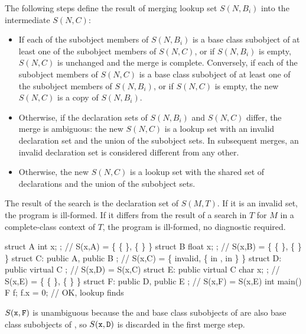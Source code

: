 \pnum
The following steps define the result of merging lookup set $S(N,B_i)$
into the intermediate $S(N,C)$:

\begin{itemize}
\item If each of the subobject members of $S(N,B_i)$ is a base class
subobject of at least one of the subobject members of $S(N,C)$, or if
$S(N,B_i)$ is empty, $S(N,C)$ is unchanged and the merge is complete.
Conversely, if each of the subobject members of $S(N,C)$ is a base class
subobject of at least one of the subobject members of $S(N,B_i)$, or if
$S(N,C)$ is empty, the new $S(N,C)$ is a copy of $S(N,B_i)$.

\item Otherwise, if the declaration sets of $S(N,B_i)$ and $S(N,C)$
differ, the merge is ambiguous: the new $S(N,C)$ is a lookup set with an
invalid declaration set and the union of the subobject sets. In
subsequent merges, an invalid declaration set is considered different
from any other.

\item Otherwise, the new $S(N,C)$ is a lookup set with the shared set of
declarations and the union of the subobject sets.
\end{itemize}

\pnum
The result of the search is the declaration set of $S(M,T)$.
If it is an invalid set, the program is ill-formed.
If it differs from the result of a search in $T$ for $M$
in a complete-class context of $T$,
the program is ill-formed, no diagnostic required.
\begin{example}
\begin{codeblock}
struct A { int x; };                    // S(x,A) = \{ \{  \}, \{  \} \}
struct B { float x; };                  // S(x,B) = \{ \{  \}, \{  \} \}
struct C: public A, public B { };       // S(x,C) = \{ invalid, \{  in ,  in  \} \}
struct D: public virtual C { };         // S(x,D) = S(x,C)
struct E: public virtual C { char x; }; // S(x,E) = \{ \{  \}, \{  \} \}
struct F: public D, public E { };       // S(x,F) = S(x,E)
int main() {
  F f;
  f.x = 0;                              // OK, lookup finds 
}
\end{codeblock}

$S(\texttt{\protect x},\texttt{\protect F})$ is unambiguous because the  and  base
class subobjects of  are also base class subobjects of , so
$S(\texttt{\protect x},\texttt{\protect D})$ is discarded in the first merge step.
\end{example}

